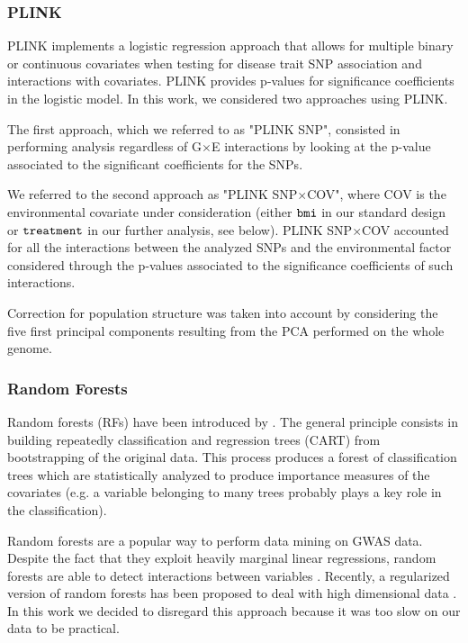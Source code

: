 \documentclass[10pt,a4paper]{article}
\begin{document}
\subsubsection{PLINK}\label{sec:plink}

PLINK implements a logistic regression approach \citep{purcell2007plink} that allows for multiple binary or continuous covariates when testing for disease trait SNP association and interactions with covariates.
PLINK provides p-values for significance coefficients in the logistic model. In this work, we considered two approaches using PLINK. 

The first approach, which we referred to as "PLINK SNP", consisted in performing analysis regardless of G$\times$E interactions by looking at the p-value associated to the significant coefficients for the SNPs. 

We referred to the second approach as "PLINK SNP$\times$COV", where COV is the environmental covariate under consideration (either $\tt{bmi}$ in our standard design or $\tt{treatment}$ in our further analysis, see below). PLINK SNP$\times$COV accounted for all the interactions between the analyzed SNPs and the environmental factor considered through the p-values associated to the significance coefficients of such interactions.

Correction for population structure was taken into account by considering the five first principal components resulting from the PCA performed on the whole genome.


\subsubsection{Random Forests}\label{sec:rf}

Random forests (RFs) have been introduced by \citet{breiman2001random}. The general principle consists in building repeatedly classification and regression trees (CART) from bootstrapping of the original data. This process produces a forest of classification trees which are statistically analyzed to produce importance measures of the covariates (e.g. a variable belonging to many trees probably plays a key role in the classification). 

Random forests are a popular way to perform data mining on GWAS data. Despite the fact that they exploit heavily marginal linear regressions, random forests are able to detect interactions between variables \citep[see][for an overview of random forests in the GWAS context]{boulesteix2012overview}. Recently, a regularized version of random forests has been proposed to deal with high dimensional data \citep{deng2012rrf}. In this work we decided to disregard this approach because it was too slow on our data to be practical.
\end{document}
